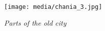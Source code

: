 \documentclass[10pt,a4paper]{article} %
\begin{document}
\begin{multicols}{3}
\begin{center}
	\texttt{[image: media/chania\_3.jpg]}
	\par\textit{Parts of the old city}
\end{center}







\end{multicols}

\end{document}
